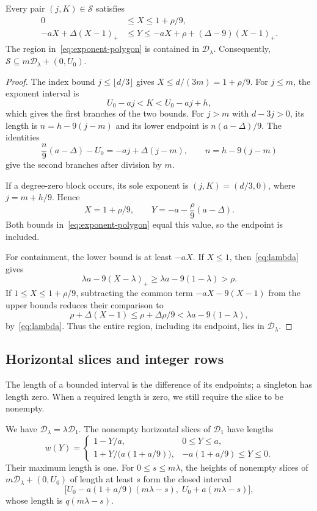 \begin{lemma}\label{lem:exponent-enclosure}
Every pair $(j,K)\in\mathcal S$ satisfies
\begin{equation}\label{eq:exponent-polygon}
 \begin{aligned}
 0&\le X\le1+\rho/9,\\
 -aX+\Delta(X-1)_+
 &\le Y\le-aX+\rho+(\Delta-9)(X-1)_+.
 \end{aligned}
\end{equation}
The region in~\eqref{eq:exponent-polygon} is contained in
$\mathcal D_\lambda$. Consequently,
$\mathcal S\subseteq m\mathcal D_\lambda+(0,U_0)$.
\end{lemma}

\begin{proof}
The index bound $j\le\lfloor d/3\rfloor$ gives
$X\le d/(3m)=1+\rho/9$. For $j\le m$, the exponent interval is
\[
 U_0-aj<K<U_0-aj+h,
\]
which gives the first branches of the two bounds. For $j>m$ with
$d-3j>0$, its length is $n=h-9(j-m)$ and its lower endpoint is
$n(a-\Delta)/9$. The identities
\[
 \frac n9(a-\Delta)-U_0=-aj+\Delta(j-m),
 \qquad n=h-9(j-m)
\]
give the second branches after division by $m$.

If a degree-zero block occurs, its sole exponent is
$(j,K)=(d/3,0)$, where $j=m+h/9$. Hence
\[
 X=1+\rho/9,\qquad
 Y=-a-\frac\rho9(a-\Delta).
\]
Both bounds in~\eqref{eq:exponent-polygon} equal this value, so the
endpoint is included.

For containment, the lower bound is at least $-aX$. If $X\le1$,
then~\eqref{eq:lambda} gives
\[
 \lambda a-9(X-\lambda)_+
 \ge\lambda a-9(1-\lambda)>\rho.
\]
If $1\le X\le1+\rho/9$, subtracting the common term
$-aX-9(X-1)$ from the upper bounds reduces their comparison to
\[
 \rho+\Delta(X-1)
 \le\rho+\Delta\rho/9
 <\lambda a-9(1-\lambda),
\]
by~\eqref{eq:lambda}. Thus the entire region, including its
endpoint, lies in $\mathcal D_\lambda$.
\end{proof}

\subsection{Horizontal slices and integer rows}

The length of a bounded interval is the difference of its endpoints;
a singleton has length zero. When a required length is zero, we still
require the slice to be nonempty.

\begin{lemma}\label{lem:slice-profile}
We have $\mathcal D_\lambda=\lambda\mathcal D_1$. The nonempty
horizontal slices of $\mathcal D_1$ have lengths
\[
 w(Y)=
 \begin{cases}
  1-Y/a,&0\le Y\le a,\\[1mm]
  1+Y/\bigl(a(1+a/9)\bigr),
       &-a(1+a/9)\le Y\le0.
 \end{cases}
\]
Their maximum length is one. For $0\le s\le m\lambda$, the heights
of nonempty slices of $m\mathcal D_\lambda+(0,U_0)$ of length at
least $s$ form the closed interval
\[
 \bigl[
 U_0-a(1+a/9)(m\lambda-s),\;
 U_0+a(m\lambda-s)
 \bigr],
\]
whose length is $q(m\lambda-s)$.
\end{lemma}

